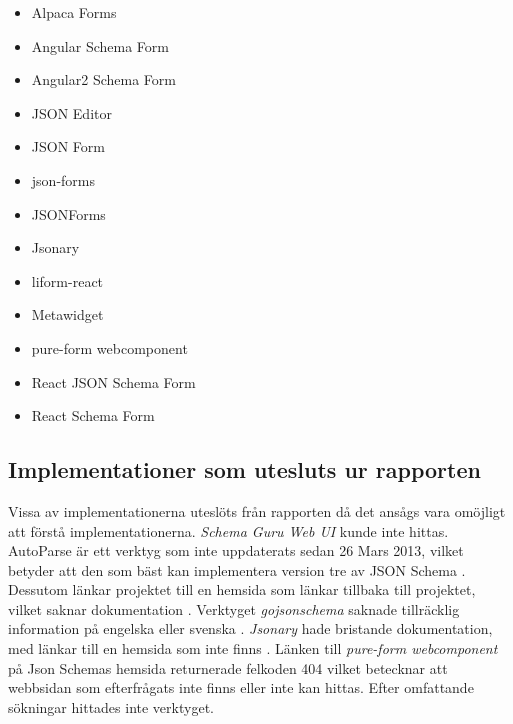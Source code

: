\begin{itemize}
	\item Alpaca Forms \cite{GitanaSoftwareInc.}
	\item Angular Schema Form \cite{Textalk}
	\item Angular2 Schema Form \cite{MakinaCorpus}
	\item JSON Editor \cite{JeremyDorn}
	\item JSON Form \cite{Joshfire}
	\item json-forms \cite{Brutusin.org}
	\item JSONForms  \cite{EclipseSource}
	\item Jsonary \cite{Jsonary-js}
	\item liform-react \cite{NachoMartin}
	\item Metawidget \cite{Metawidget}
	\item pure-form webcomponent
	\item React JSON Schema Form \cite{MozillaServices}
	\item React Schema Form \cite{NetworkNewTechnologiesInc.}
\end{itemize}

\subsection{Implementationer som utesluts ur rapporten}

Vissa av implementationerna uteslöts från rapporten då det ansågs vara omöjligt att förstå implementationerna. \textit{Schema Guru Web UI} kunde inte hittas. AutoParse är ett verktyg som inte uppdaterats sedan 26 Mars 2013, vilket betyder att den som bäst kan implementera version tre av JSON Schema \cite{Googleb}. Dessutom länkar projektet till en hemsida som länkar tillbaka till projektet, vilket saknar dokumentation \cite{Googleb}. Verktyget \textit{gojsonschema} saknade tillräcklig information på engelska eller svenska \cite{Zhangtao}. \textit{Jsonary} hade bristande dokumentation, med länkar till en hemsida som inte finns \cite{Jsonary-js}. Länken till \textit{pure-form webcomponent} på Json Schemas hemsida returnerade felkoden 404 vilket betecknar att webbsidan som efterfrågats inte finns eller inte kan hittas. Efter omfattande sökningar hittades inte verktyget.